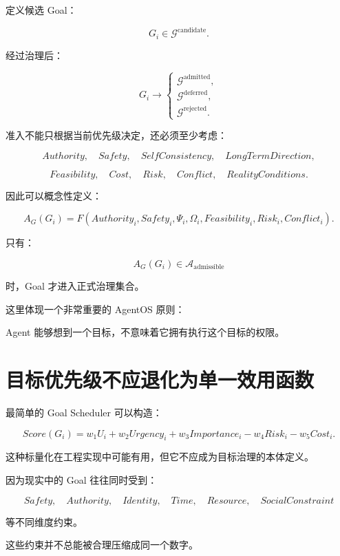 定义候选 Goal：

\[
G_i\in\mathcal G^{\mathrm{candidate}}.
\]

经过治理后：

\[
G_i
\longrightarrow
\begin{cases}
\mathcal G^{\mathrm{admitted}},\\
\mathcal G^{\mathrm{deferred}},\\
\mathcal G^{\mathrm{rejected}}.
\end{cases}
\]

准入不能只根据当前优先级决定，还必须至少考虑：

\[
Authority,
\quad
Safety,
\quad
SelfConsistency,
\quad
LongTermDirection,
\]

\[
Feasibility,
\quad
Cost,
\quad
Risk,
\quad
Conflict,
\quad
RealityConditions.
\]

因此可以概念性定义：

\[
A_G(G_i)
=
F(
Authority_i,
Safety_i,
\Psi_i,
\Omega_i,
Feasibility_i,
Risk_i,
Conflict_i
).
\]

只有：

\[
A_G(G_i)\in\mathcal A_{\mathrm{admissible}}
\]

时，Goal 才进入正式治理集合。

这里体现一个非常重要的 AgentOS 原则：

\begin{statementbox}
\centering
{}
\end{statementbox}

Agent 能够想到一个目标，不意味着它拥有执行这个目标的权限。


\section{目标优先级不应退化为单一效用函数}

最简单的 Goal Scheduler 可以构造：

\[
Score(G_i)
=
w_1U_i
+
w_2Urgency_i
+
w_3Importance_i
-
w_4Risk_i
-
w_5Cost_i.
\]

这种标量化在工程实现中可能有用，但它不应成为目标治理的本体定义。

因为现实中的 Goal 往往同时受到：

\[
Safety,
\quad
Authority,
\quad
Identity,
\quad
Time,
\quad
Resource,
\quad
SocialConstraint
\]

等不同维度约束。

这些约束并不总能被合理压缩成同一个数字。

